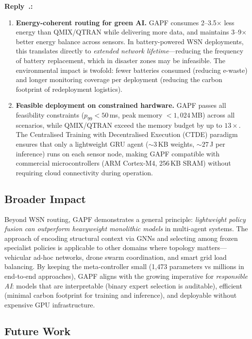 \documentclass[11pt]{article}
\newcounter{reviewer}
\newcounter{replyctr}[reviewer]
\renewcommand{\thereplyctr}{\thereviewer.\arabic{replyctr}}
\newenvironment{reply}
  {\refstepcounter{replyctr}%
   \addtocounter{replyctr}{-1}%
   \medskip\noindent
   \begin{sf}\textbf{Reply~\thereplyctr:}\ }
  {\addtocounter{replyctr}{1}%
   \medskip\end{sf}}
\begin{document}
\begin{refsection}
\begin{mdframed}[style=Resp]
\begin{reply}
\begin{enumerate}
    \item \textbf{Energy-coherent routing for green AI.} GAPF consumes 2--3.5$\times$ less energy than QMIX/QTRAN while delivering more data, and maintains 3--9$\times$ better energy balance across sensors. In battery-powered WSN deployments, this translates directly to \emph{extended network lifetime}---reducing the frequency of battery replacement, which in disaster zones may be infeasible. The environmental impact is twofold: fewer batteries consumed (reducing e-waste) and longer monitoring coverage per deployment (reducing the carbon footprint of redeployment logistics).
    
    \item \textbf{Feasible deployment on constrained hardware.} GAPF passes all feasibility constraints ($p_{99} < 50$\,ms, peak memory $< 1{,}024$\,MB) across all scenarios, while QMIX/QTRAN exceed the memory budget by up to $13\times$. The Centralised Training with Decentralised Execution (CTDE) paradigm ensures that only a lightweight GRU agent (${\sim}3$\,KB weights, ${\sim}27$\,\textmu J per inference) runs on each sensor node, making GAPF compatible with commercial microcontrollers (ARM Cortex-M4, 256\,KB SRAM) without requiring cloud connectivity during operation.
\end{enumerate}

\subsection{Broader Impact}

Beyond WSN routing, GAPF demonstrates a general principle: \emph{lightweight policy fusion can outperform heavyweight monolithic models} in multi-agent systems. The approach of encoding structural context via GNNs and selecting among frozen specialist policies is applicable to other domains where topology matters---vehicular ad-hoc networks, drone swarm coordination, and smart grid load balancing. By keeping the meta-controller small (1{,}473 parameters vs millions in end-to-end approaches), GAPF aligns with the growing imperative for \emph{responsible AI}: models that are interpretable (binary expert selection is auditable), efficient (minimal carbon footprint for training and inference), and deployable without expensive GPU infrastructure.

\subsection{Future Work}


\end{reply}
\end{mdframed}
\end{refsection}
\end{document}
